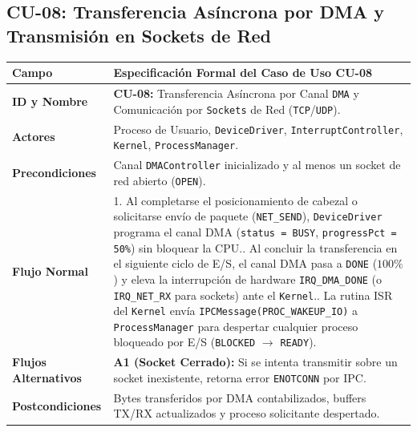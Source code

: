 \documentclass[10pt,twocolumn,letterpaper]{article}
\begin{document}
\subsection{CU-08: Transferencia As\'incrona por DMA y Transmisi\'on en Sockets de Red}
\begin{table}[!htb]
\centering
\scriptsize
\renewcommand{\arraystretch}{1.12}
\begin{tabularx}{\columnwidth}{L{2.1cm} Y}
\toprule
\textbf{Campo} & \textbf{Especificaci\'on Formal del Caso de Uso CU-08} \\
\midrule
\textbf{ID y Nombre} & \textbf{CU-08:} Transferencia As\'incrona por Canal \texttt{DMA} y Comunicaci\'on por \texttt{Sockets} de Red (\texttt{TCP}/\texttt{UDP}). \\
\textbf{Actores} & Proceso de Usuario, \texttt{DeviceDriver}, \texttt{InterruptController}, \texttt{Kernel}, \texttt{ProcessManager}. \\
\textbf{Precondiciones} & Canal \texttt{DMAController} inicializado y al menos un socket de red abierto (\texttt{OPEN}). \\
\textbf{Flujo Normal} & 1. Al completarse el posicionamiento de cabezal o solicitarse env\'io de paquete (\texttt{NET\_SEND}), \texttt{DeviceDriver} programa el canal DMA (\texttt{status = BUSY}, \texttt{progressPct = 50\%}) sin bloquear la CPU.. Al concluir la transferencia en el siguiente ciclo de E/S, el canal DMA pasa a \texttt{DONE} ($100\%$) y eleva la interrupci\'on de hardware \texttt{IRQ\_DMA\_DONE} (o \texttt{IRQ\_NET\_RX} para sockets) ante el \texttt{Kernel}.. La rutina ISR del \texttt{Kernel} env\'ia \texttt{IPCMessage(PROC\_WAKEUP\_IO)} a \texttt{ProcessManager} para despertar cualquier proceso bloqueado por E/S (\texttt{BLOCKED} $\rightarrow$ \texttt{READY}). \\
\textbf{Flujos Alternativos} & \textbf{A1 (Socket Cerrado):} Si se intenta transmitir sobre un socket inexistente, retorna error \texttt{ENOTCONN} por IPC. \\
\textbf{Postcondiciones} & Bytes transferidos por DMA contabilizados, buffers TX/RX actualizados y proceso solicitante despertado. \\
\bottomrule
\end{tabularx}
\end{table}
\end{document}
